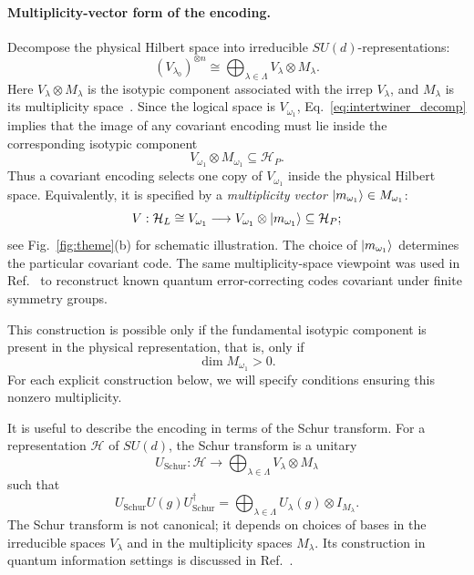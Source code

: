 \documentclass[10pt,twocolumn,superscriptaddress,aps,amsmath,amssymb,citeautoscript,floatfix,prx,longbibliography]{revtex4-2}
\theoremstyle{plain}
\theoremstyle{plain}
\theoremstyle{plain}
\theoremstyle{plain}
\theoremstyle{plain}
\theoremstyle{plain}
\begin{document}
\paragraph{Multiplicity-vector form of the encoding.}

Decompose the physical Hilbert space into irreducible $SU(d)$-representations:
\begin{equation}\label{eq:isotipic_decomp}
(V_{\lambda_0})^{\otimes n}
\cong
\bigoplus_{\lambda\in\Lambda}
V_\lambda\otimes M_\lambda .
\end{equation}
Here $V_\lambda\otimes M_\lambda$ is the isotypic component associated with the irrep $V_\lambda$, and $M_\lambda$ is its multiplicity space~\cite{Kong2022}. Since the logical space is $V_{\omega_1}$, Eq.~\eqref{eq:intertwiner_decomp} implies that the image of any covariant encoding must lie inside the corresponding isotypic component
$$
V_{\omega_1}\otimes M_{\omega_1}
\subseteq
\mathcal H_P .
$$
Thus a covariant encoding selects one copy of $V_{\omega_1}$ inside the physical Hilbert space. Equivalently, it is specified by a \textit{multiplicity vector} $\ket{m_{\omega_1}}\in M_{\omega_1}$:
\begin{equation}\label{eq:mult_vec_enc}
V:
\mathcal H_L
\cong
V_{\omega_1}
\longrightarrow
V_{\omega_1}\otimes\ket{m_{\omega_1}}
\subseteq
\mathcal H_P;
\end{equation}
see Fig.~\ref{fig:theme}(b) for schematic illustration. The choice of $\ket{m_{\omega_1}}$ determines the particular covariant code. The same multiplicity-space viewpoint was used in Ref.~\cite{Denys2024} to reconstruct known quantum error-correcting codes covariant under finite symmetry groups.

This construction is possible only if the fundamental isotypic component is present in the physical representation, that is, only if
$$
\dim M_{\omega_1}>0 .
$$
For each explicit construction below, we will specify conditions ensuring this nonzero multiplicity.

It is useful to describe the encoding in terms of the Schur transform. For a representation $\mathcal H$ of $SU(d)$, the Schur transform is a unitary
$$
U_{\mathrm{Schur}}:
\mathcal H
\longrightarrow
\bigoplus_{\lambda\in\Lambda}
V_\lambda\otimes M_\lambda
$$
such that
\begin{equation}\label{eq:schur_transform}
U_{\mathrm{Schur}}
U(g)
U_{\mathrm{Schur}}^\dagger
=
\bigoplus_{\lambda\in\Lambda}
U_\lambda(g)\otimes I_{M_\lambda}.
\end{equation}
The Schur transform is not canonical; it depends on choices of bases in the irreducible spaces $V_\lambda$ and in the multiplicity spaces $M_\lambda$. Its construction in quantum information settings is discussed in Ref.~\cite{Bacon2006}.
\end{document}
